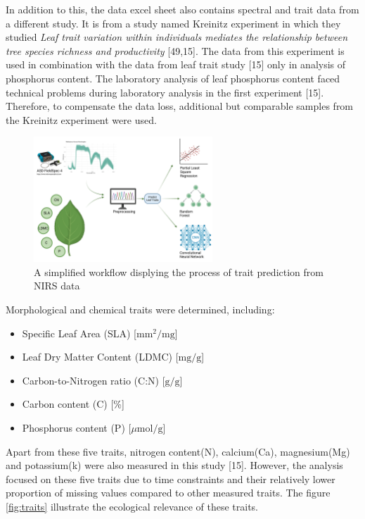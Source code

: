 \documentclass[12pt,a4paper]{report}
\begin{document}
In addition to this, the data excel sheet also contains spectral and trait data from a different study. It is from a study named Kreinitz experiment in which they studied \textit{Leaf trait variation within individuals mediates the relationship between tree species richness and productivity} [49,15]. The data from this experiment is used in combination with the data from leaf trait study [15] only in analysis of phosphorus content. The laboratory analysis of leaf phosphorus content faced technical problems during laboratory analysis in the first experiment [15]. Therefore, to compensate the data loss, additional but comparable samples from the Kreinitz experiment were used. \\

\begin{figure}[h]
    \centering
    \includegraphics[width=0.6\textwidth]{Figures/nirs.png}
    \caption{A simplified workflow displying the process of trait prediction from NIRS data}
    \label{fig:nirs_workflow}
\end{figure}
Morphological and chemical traits were determined, including:
\begin{itemize}
    \item Specific Leaf Area (SLA)  [$\text{mm}^2/\text{mg}$]
    \item Leaf Dry Matter Content (LDMC)  [$\text{mg}/\text{g}$]
    \item Carbon-to-Nitrogen ratio (C:N)  [$\text{g}/\text{g}$]
    \item Carbon content (C)  [\%]
    \item Phosphorus content (P) [$\mu\text{mol}/\text{g}$]
\end{itemize}

Apart from these five traits, nitrogen content(N), calcium(Ca), magnesium(Mg) and potassium(k) were also measured in this study [15]. However, the analysis focused on these five traits due to time constraints and their relatively lower proportion of missing values compared to other measured traits. The figure \ref{fig:traits} illustrate the ecological relevance of these traits.
\end{document}
